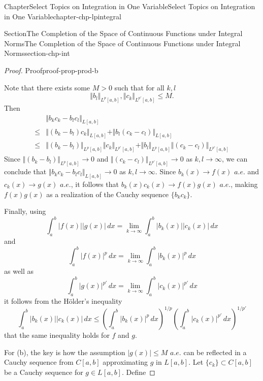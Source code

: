 \documentclass[oneside,10pt,]{book}
\numberwithin{equation}{section}
\newcommand{\amp}{&}
\begin{document}
\begin{chapterptx}{Chapter}{Select Topics on Integration in One Variable}{}{Select Topics on Integration in One Variable}{}{}{chapter-chp-lpintegral}
\begin{sectionptx}{Section}{The Completion of the Space of Continuous Functions under Integral Norms}{}{The Completion of the Space of Continuous Functions under Integral Norms}{}{}{section-chp-int}
\begin{proof}{Proof}{}{proof-prop-prod-b}
\par
Note that there exists some \(M > 0\) such that for all \(k, l\)%
\begin{equation*}
\Vert b_{l} \Vert_{L^{p}[a,b]}, \Vert c_{k}\Vert_{L^{p'}[a,b]}\le M.
\end{equation*}
Then%
\begin{align*}
\amp \Vert b_{k}c_{k}-b_{l}c_{l}\Vert_{L[a,b]} \\
\le \amp \Vert \left(b_{k}-b_{l}\right)c_{k}\Vert_{L[a,b]} +
\Vert b_{l}\left( c_{k}-c_{l} \right)\Vert_{L[a,b]}\\
\le \amp \Vert \left(b_{k}-b_{l}\right)\Vert_{L^{p}[a,b]} \Vert c_{k}\Vert_{L^{p'}[a,b]}
+ \Vert b_{l} \Vert_{L^{p}[a,b]} \Vert \left( c_{k}-c_{l} \right)\Vert_{L^{p'}[a,b]}
\end{align*}
Since \(\Vert \left(b_{k}-b_{l}\right)\Vert_{L^{p}[a,b]} \to 0\) and \(\Vert \left( c_{k}-c_{l} \right)\Vert_{L^{p'}[a,b]}\to 0\) as \(k, l\to \infty\), we can conclude that \(\Vert b_{k}c_{k}-b_{l}c_{l}\Vert_{L[a,b]} \to 0\) as \(k, l\to \infty\).  Since \(b_{k}(x)\to f(x)\) \(a.e.\) and \(c_{k}(x)\to g(x)\) \(a.e.\), it follows that \(b_{k}(x)c_{k}(x)\to f(x)g(x)\) \(a.e.\), making \(f(x)g(x)\) as a realization of the Cauchy sequence \(\{b_{k}c_{k}\}\).%
\par
Finally, using%
\begin{equation*}
\int_{a}^{b} |f(x)||g(x)|\, dx = \lim_{k\to \infty} \int_{a}^{b} |b_{k}(x)||c_{k}(x)|\, dx
\end{equation*}
and%
\begin{equation*}
\int_{a}^{b} |f(x)|^{p}\, dx= \lim_{k\to \infty} \int_{a}^{b} |b_{k}(x)|^{p}\, dx
\end{equation*}
as well as%
\begin{equation*}
\int_{a}^{b} |g(x)|^{p'}\, dx= \lim_{k\to \infty} \int_{a}^{b} |c_{k}(x)|^{p'}\, dx
\end{equation*}
it follows from the Hölder's inequality%
\begin{equation*}
\int_{a}^{b} |b_{k}(x)||c_{k}(x)|\, dx
\le \left(\int_{a}^{b} |b_{k}(x)|^{p}\, dx\right)^{1/p}
\left(\int_{a}^{b} |c_{k}(x)|^{p'}\, dx\right)^{1/p'}
\end{equation*}
that the same inequality holds for \(f\) and \(g\).%
\par
For (b), the key is how the assumption \(|g(x)|\le M\) \(a.e.\) can be reflected in a Cauchy sequence from \(C[a, b]\) approximating \(g\) in \(L[a, b]\). Let \(\{c_{k}\}\subset C[a, b]\) be a Cauchy sequence for \(g\in L[a, b]\). Define%

\end{proof}
\end{sectionptx}
\end{chapterptx}
\end{document}
